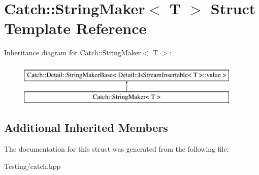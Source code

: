 \hypertarget{struct_catch_1_1_string_maker}{\section{Catch\-:\-:String\-Maker$<$ T $>$ Struct Template Reference}
\label{struct_catch_1_1_string_maker}
}
Inheritance diagram for Catch\-:\-:String\-Maker$<$ T $>$\-:\begin{figure}[H]
\begin{center}
\leavevmode
\includegraphics[height=2.000000cm]{struct_catch_1_1_string_maker}
\end{center}
\end{figure}
\subsection*{Additional Inherited Members}


The documentation for this struct was generated from the following file\-:\begin{DoxyCompactItemize}
\item 
Testing/catch.\-hpp\end{DoxyCompactItemize}
